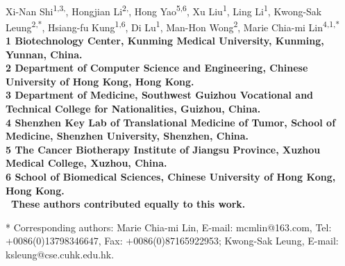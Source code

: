 \documentclass[10pt,letterpaper]{article}
\date{}
\begin{document}
\vspace*{0.35in}

\begin{flushleft}
{\Large
\textbf{}
}
\newline
\\
Xi-Nan Shi\textsuperscript{1,3,\dag},%
Hongjian Li\textsuperscript{2,\dag},%
Hong Yao\textsuperscript{5,6},%
Xu Liu\textsuperscript{1},%
Ling Li\textsuperscript{1},%
Kwong-Sak Leung\textsuperscript{2,*},%
Hsiang-fu Kung\textsuperscript{1,6},%
Di Lu\textsuperscript{1},%
Man-Hon Wong\textsuperscript{2},%
Marie Chia-mi Lin\textsuperscript{4,1,*}%
\\
\bf{1} Biotechnology Center, Kunming Medical University, Kunming, Yunnan, China.\\
\bf{2} Department of Computer Science and Engineering, Chinese University of Hong Kong, Hong Kong.\\
\bf{3} Department of Medicine, Southwest Guizhou Vocational and Technical College for Nationalities, Guizhou, China.\\
\bf{4} Shenzhen Key Lab of Translational Medicine of Tumor, School of Medicine, Shenzhen University, Shenzhen, China.\\
\bf{5} The Cancer Biotherapy Institute of Jiangsu Province, Xuzhou Medical College, Xuzhou, China.\\
\bf{6} School of Biomedical Sciences, Chinese University of Hong Kong, Hong Kong.\\

% 
%
\dag\ These authors contributed equally to this work.





* Corresponding authors: Marie Chia-mi Lin, E-mail: mcmlin@163.com, Tel: +0086(0)13798346647, Fax: +0086(0)87165922953; Kwong-Sak Leung, E-mail: ksleung@cse.cuhk.edu.hk.
\end{flushleft}
\end{document}
